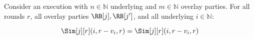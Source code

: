 \begin{conjecture}\label{conj:cross-party}
  Consider an \rollerblade execution with $n \in \mathbb{N}$ underlying
  and $m \in \mathbb{N}$ overlay parties.
  For all rounds $r$, all overlay parties $\RB[j], \RB[j']$,
  and all underlying $i \in \mathbb{N}$:

  \[
    \Sim[j][r](i, r - v_i, r) = \Sim[j][r](i, r - v_i, r)
  \]
\end{conjecture}

